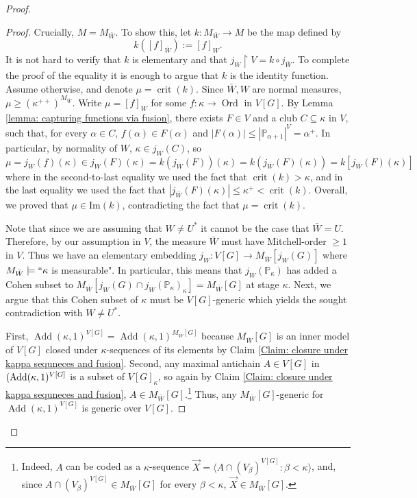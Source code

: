 \documentclass[11pt]{amsart}
\renewcommand{\restriction}{\mathbin\upharpoonright}    %
\theoremstyle{definition}
\theoremstyle{remark}
\newcommand\<{{<}}
\DeclareMathOperator{\Add}{Add}
\DeclareMathOperator{\crit}{crit}
\DeclareMathOperator{\ord}{Ord}
\newcommand{\la}{\langle}
\newcommand{\ra}{\rangle}
\begin{document}
\begin{proof}
\begin{proof}
{Crucially, $M=M_{\bar W}$.} To show this, let $k\colon M_{\bar{W}}\to M$ be the map defined by $$k([f]_{\bar{W}}) := [f]_{W}.$$ It is not hard to verify that $k$ is elementary and that $j_W\restriction V = k\circ j_{\bar{W}}$. To complete the proof of the equality it is  enough to argue that $k$ is the identity function. Assume otherwise, and denote $\mu = \crit(k)$. Since $\bar{W}, W$ are normal measures, $\mu\geq (\kappa^{++})^{M_{\bar{W}}}$. Write $\mu = [f]_W$ for some $f\colon \kappa\to \ord$ in $V[G]$. By Lemma \ref{lemma: capturing functions via fusion}, there exists $F\in V$ and a club $C\subseteq \kappa$ in $V$, such that, for every $\alpha\in C$, $f(\alpha)\in F(\alpha)$ and $|F(\alpha)|\leq|\mathbb{P}_{\alpha+1}|^V= \alpha^+$. In particular, by normality of $W$, $\kappa\in j_W(C)$, so
    $$\mu = j_W(f)(\kappa)  \in j_{W}(F)(\kappa) = k(j_{\bar{W}}(F))(\kappa) = k(j_{\bar{W}}(F)(\kappa)) = k[ j_{\bar{W}}(F)(\kappa)]$$
    where in the second-to-last equality we used the fact that  $\crit(k)>\kappa$, and in the last equality we used the fact that $|j_{\bar{W}}(F)(\kappa)|\leq \kappa^{+}< \crit(k)$. Overall, we proved that $\mu\in \text{Im}(k)$, contradicting the fact that $\mu = \crit(k)$.   

    \smallskip

Note that since we are assuming that $W\neq U^*$ it cannot be the case that $\bar{W}=U$. Therefore,  by our assumption in $V$, the measure $\bar{W}$ must have Mitchell-order ${\geq 1}$ in $V$. Thus we have an elementary embedding $j_W\colon V[G]\rightarrow M_{\bar W}[j_{{W}}(G)]$ 
where $M_{\bar W}\models ``\kappa$ is measurable". In particular, this means that $j_W(\mathbb{P}_\kappa)$ has added a Cohen subset to $M_{\bar W}[j_W(G)\cap j_W(\mathbb{P}_\kappa)_\kappa]=M_{\bar{W}}[G]$ at stage  $\kappa$. Next, we argue that this Cohen subset of $\kappa$ must be $V[G]$-generic which yields the sought contradiction with $W\neq U^*$.

First, $\Add(\kappa,1)^{V[G]}=\Add(\kappa,1)^{M_{\bar W}[G]}$ because $M_{\bar W}[G]$ is an inner model of $V[G]$ closed under $\kappa$-sequences of its elements by Claim \ref{Claim: closure under kappa sequneces and fusion}. Second, any maximal antichain $A\in V[G]$ in $({\rm{Add}}(\kappa, 1)^{V[G]}$ is a subset of $V[G]_\kappa$, so again by Claim \ref{Claim: closure under kappa sequneces and fusion}, $A\in M_{\bar{W}}[G]$.\footnote{Indeed, $A$ can be coded as a $\kappa$-sequence $\vec{X} = \la A\cap (V_\beta)^{V[G]} \colon \beta<\kappa \ra$, and, since $A\cap (V_\beta)^{V[G]}\in M_{\bar{W}}[G]$ for every $\beta<\kappa$, $\vec{X}\in M_{\bar{W}}[G]$.}
Thus, any $M_{\bar{W}}[G]$-generic for $\Add(\kappa,1)^{V[G]}$ is generic over $V[G]$.
\end{proof}


\end{proof}
\end{document}
